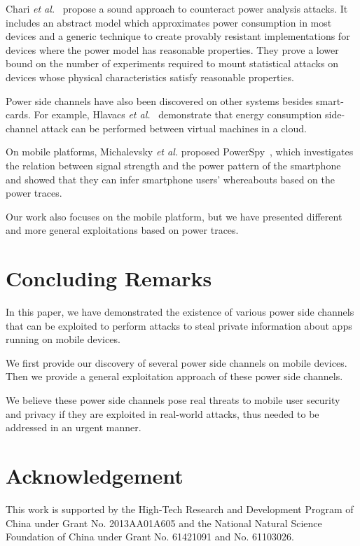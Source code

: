 \documentclass{sig-alternate}
\begin{document}
Chari \emph{et al.}~\cite{chari1999towards} propose a sound approach to counteract power analysis attacks. It includes an abstract model which approximates power consumption in most devices and a generic technique to create provably resistant implementations for devices where the power model has reasonable properties. They prove a lower bound on the number of experiments required to mount statistical attacks on devices whose physical characteristics satisfy reasonable properties.

Power side channels have also been discovered on other systems besides smart-cards. For example, Hlavacs \emph{et al.}~\cite{hlavacs2011energy} demonstrate that energy consumption side-channel attack can be performed between virtual machines in a cloud.

On mobile platforms, Michalevsky \emph{et al.} proposed PowerSpy~\cite{MichalevskyNSB15}, which investigates the relation between signal strength and the power pattern of the smartphone and showed that they can infer smartphone users' whereabouts based on the power traces.

Our work also focuses on the mobile platform, but we have presented different and more general exploitations based on power traces.







\section{Concluding Remarks}
\label{sec:con}

In this paper, we have demonstrated the existence of various power side channels that can be exploited to perform attacks to steal private information about apps running on mobile devices. 

We first provide our discovery of several power side channels on mobile devices. Then we provide a general exploitation approach of these power side channels. 

We believe these power side channels pose real threats to mobile user security and privacy if they are exploited in real-world attacks, thus needed to be addressed in an urgent manner.

\section{Acknowledgement}
This work is supported by the High-Tech Research and Development Program of China under Grant No. 2013AA01A605 and  the National Natural Science Foundation of China under Grant No. 61421091 and No. 61103026.


\balance

\end{document}
